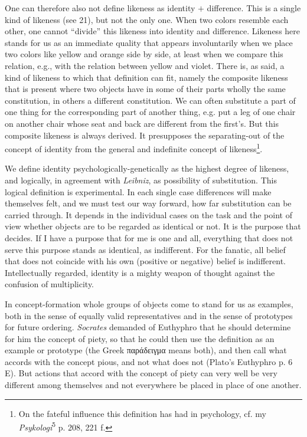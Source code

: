 \documentclass[12pt,a4paper]{book}
\newcommand{\opage}[1]{\marginnote{\footnotesize\textit{[#1]}}}
\begin{document}
One can therefore also not define likeness as identity $+$ difference. This
is a single kind of likeness (see 21), but not the only one. When two colors
resemble each other, one cannot ``divide'' this likeness into identity and
difference. Likeness here stands for us as an immediate quality that appears
involuntarily when we place two colors like yellow and orange side by side,
at least when we compare this relation, e.g., with the relation between
yellow and violet. There is, as said, a kind of likeness to which that
definition can fit, namely the composite likeness that is present where two
objects have in some of their parts wholly the same constitution, in others
a different constitution. We can often substitute a part of one thing for the
corresponding part of another thing, e.g. put a leg of one chair on another
chair whose seat and back are different from the first's. But this composite
likeness is always derived. It presupposes the separating-out of the concept
of identity from the general and indefinite concept of
likeness\footnote{On the fateful influence this definition has had in
psychology, cf. my \emph{Psykologi}\textsuperscript{5} p. 208, 221 f.}.

We define identity psychologically-genetically as the highest degree of
likeness, and logically, in agreement with \emph{Leibniz}, as possibility of
substitution. This logical definition is experimental. In each single case
differences will make themselves felt, and we must test our way forward, how
far substitution can be carried through. It depends in the individual cases
on the task and the point of view whether objects are to be regarded as
identical or not. It is the purpose that decides. If I have a purpose that
for me is one and all, everything that does not serve this purpose stands as
identical, as indifferent. For the fanatic, all belief that does not
coincide with his own (positive or negative) belief is indifferent.
Intellectually regarded, \opage{179}identity is a mighty weapon of thought against the
confusion of multiplicity.

In concept-formation whole groups of objects come to stand for us as
examples, both in the sense of equally valid representatives and in the
sense of prototypes for future ordering. \emph{Socrates} demanded of
Euthyphro that he should determine for him the concept of piety, so that he
could then use the definition as an example or prototype (the Greek
παράδειγμα means both), and then call what accords with the concept pious,
and not what does not (Plato's Euthyphro p. 6 E). But actions that accord
with the concept of piety can very well be very different among themselves and
not everywhere be placed in place of one another.
\end{document}
